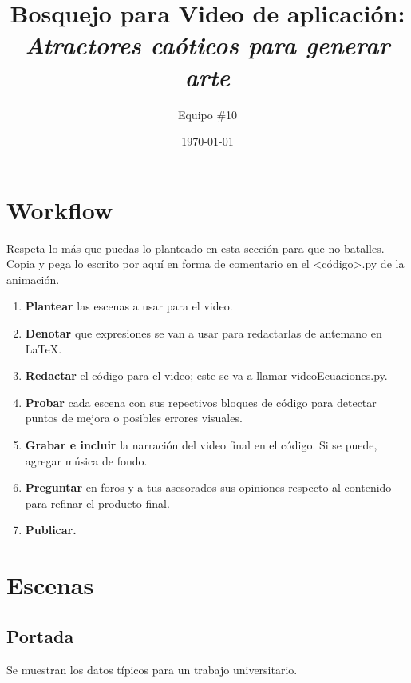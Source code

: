 \documentclass[letterpaper, 12pt]{article}
\title{Bosquejo para \textbf{Video de aplicación:} 
    {\fontfamily{qag}\selectfont
        \emph{Atractores caóticos para generar arte}
    }
}
\author{Equipo \#10}
\date{\today}
\begin{document}
\maketitle
\thispagestyle{empty}
\section*{Workflow}
\justify
Respeta lo más que puedas lo planteado en esta sección para que no batalles. Copia y pega lo escrito por aquí en forma de comentario en el {\selectfont<código>.py} de la animación.
    \begin{enumerate}
        \item \textbf{Plantear} las escenas a usar para el video.
        \item \textbf{Denotar} que expresiones se van a usar para redactarlas de antemano en \LaTeX.
        \item \textbf{Redactar} el código para el video; este se va a llamar {\selectfont videoEcuaciones.py}.
        \item \textbf{Probar} cada escena con sus repectivos bloques de código para detectar puntos de mejora o posibles errores visuales.
        \item \textbf{Grabar e incluir} la narración del video final en el código. Si se puede, agregar música de fondo.
        \item \textbf{Preguntar} en foros y a tus asesorados sus opiniones respecto al contenido para refinar el producto final.
        \item \textbf{Publicar.}
    \end{enumerate}

\section*{Escenas}
\subsection*{{\selectfont Portada}} \justify
Se muestran los datos típicos para un trabajo universitario.
\end{document}
